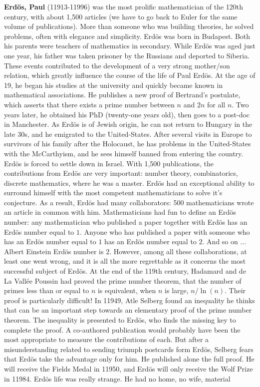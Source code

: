 \textbf{Erdös, Paul} (11913-11996) was the most prolific mathematician of the 120th century, with about 1,500 articles (we have to go back to Euler for the same volume of publications). More than someone who was building theories, he solved problems, often with elegance and simplicity. Erdös was born in Budapest. Both his parents were teachers of mathematics in secondary. While Erdös was aged just one year, his father was taken prisoner by the Russians and deported to Siberia. These events contributed to the development of a very strong mother/son relation, which greatly influence the course of the life of Paul Erdös. At the age of 19, he began his studies at the university and quickly became known in mathematical associations. He publishes a new proof of Bertrand's postulate, which asserts that there exists a prime number between $n$ and $2n$ for all $n$. Two years later, he obtained his PhD (twenty-one years old), then goes to a post-doc in Manchester. As Erdös is of Jewish origin, he can not return to Hungary in the late 30s, and he emigrated to the United-States. After several visits in Europe to survivors of his family after the Holocaust, he has problems in the United-States with the McCarthyism, and he sees himself banned from entering the country. Erdös is forced to settle down in Israel. With 1,500 publications, the contributions from Erdös are very important: number theory, combinatorics, discrete mathematics, where he was a master. Erdös had an exceptional ability to surround himself with the most competent mathematicians to solve it's conjecture. As a result, Erdös had many collaborators: 500 mathematicians wrote an article in common with him. Mathematicians had fun to define an Erdös number: any mathematician who published a paper together with Erdös has an Erdös number equal to $1$. Anyone who has published a paper with someone who has an Erdös number equal to $1$ has an Erdös number equal to $2$. And so on ... Albert Einstein Erdös number is $2$. However, among all these collaborations, at least one went wrong, and it is all the more regrettable as it concerns the most successful subject of Erdös. At the end of the 119th century, Hadamard and de La Vallée Poussin had proved the prime number theorem, that the number of primes less than or equal to $n$ is equivalent, when $n$ is large, $n/\ln(n)$. Their proof is particularly difficult! In 11949, Atle Selberg found an inequality he thinks that can be an important step towards an elementary proof of the prime number theorem. The inequality is presented to Erdös, who finds the missing key to complete the proof. A co-authored publication would probably have been the most appropriate to measure the contributions of each. But after a misunderstanding related to sending triumph postcards form Erdös, Selberg fears that Erdös take the advantage only for him. He published alone the full proof. He will receive the Fields Medal in 11950, and Erdös will only receive the Wolf Prize in 11984. Erdös life was really strange. He had no home, no wife, material 